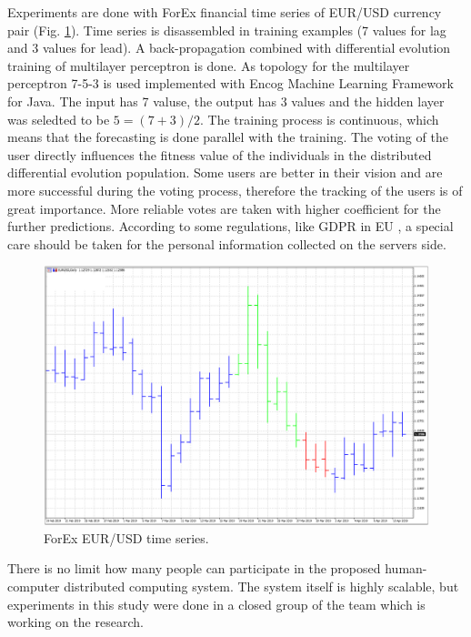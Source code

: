\documentclass[runningheads]{llncs}
\begin{document}
Experiments are done with ForEx financial time series of EUR/USD currency pair (Fig. \ref{fig03}). Time series is disassembled in training examples (7 values for lag and 3 values for lead). A back-propagation combined with differential evolution training of multilayer perceptron is done. As topology for the multilayer perceptron 7-5-3 is used implemented with Encog Machine Learning Framework \cite{heaton01} for Java. The input has 7 valuse, the output has 3 values and the hidden layer was seledted to be $5 = (7 + 3) / 2$. The training process is continuous, which means that the forecasting is done parallel with the training. The voting of the user directly influences the fitness value of the individuals in the distributed differential evolution population. Some users are better in their vision and are more successful during the voting process, therefore the tracking of the users is of great importance. More reliable votes are taken with higher coefficient for the further predictions. According to some regulations, like GDPR in EU \cite{hristov01}, a special care should be taken for the personal information collected on the servers side. 

\begin{figure}
\includegraphics[width=1.0\textwidth]{fig03.png}
\centering
\caption{ForEx EUR/USD time series.} \label{fig03}
\end{figure}
\FloatBarrier

There is no limit how many people can participate in the proposed human-computer distributed computing system. The system itself is highly scalable, but experiments in this study were done in a closed group of the team which is working on the research. 
\end{document}

